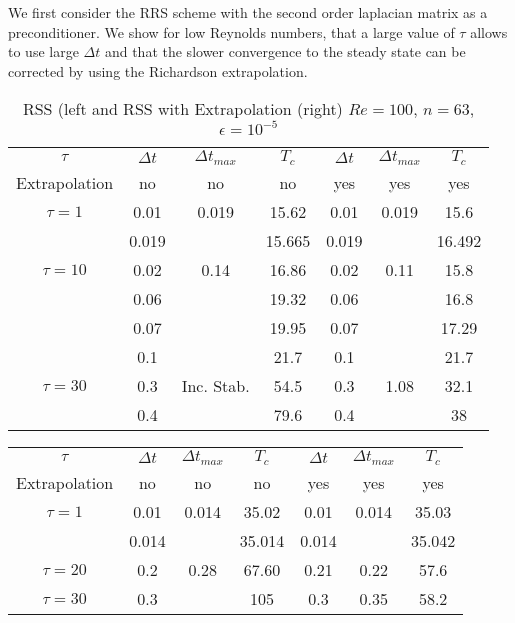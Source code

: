 \documentclass[11pt]{article}
\begin{document}
{We first consider the RRS scheme with the second order laplacian matrix  as a preconditioner. We show for low Reynolds numbers, that a large value of $\tau$ allows to use large $\Delta t$ and that the slower convergence to the steady state can be corrected by using the Richardson extrapolation.
\begin{table}[h!]
\begin{center}
\begin{tabular}{|c||c|c|c||c|c|c|}
\hline
$\tau$ & $\Delta t$ & $\Delta t_{max}$ & $T_c$ & $\Delta t$ & $\Delta t_{max}$ & $T_c$\\
Extrapolation & no  & no  & no  & yes& yes& yes\\
\hline 
\hline 
$\tau = 1$ & 0.01 & 0.019 & 15.62 & 0.01 & 0.019 & 15.6 \\ 
\hline
              & 0.019 &    & 15.665 & 0.019& & 16.492 \\
\hline 
\hline
$\tau = 10$&  0.02 & 0.14 & 16.86 & 0.02 & 0.11 & 15.8 \\ 
\hline 
  & 0.06 &   & 19.32 & 0.06 &   & 16.8 \\ 
\hline 
  & 0.07 &   & 19.95 & 0.07 &   & 17.29 \\ 
\hline 
  & 0.1 &   & 21.7  & 0.1 &   & 21.7 \\  
\hline 
\hline
$\tau = 30$    & 0.3 & Inc. Stab. & 54.5 & 0.3 &  1.08 & 32.1 \\ 
\hline 
  & 0.4 &   & 79.6 & 0.4 &   & 38 \\ 
\hline 
\hline
\end{tabular}
\caption{RSS (left and RSS with  Extrapolation (right) $Re=100$, $n=63$, $\epsilon=10^{-5}$}
\label{tab1}
\end{center}
\end{table}
\begin{table}[h!]
\begin{center}
\begin{tabular}{|c||c|c|c||c|c|c|}
\hline
$\tau$ & $\Delta t$ & $\Delta t_{max}$ & $T_c$ & $\Delta t$ & $\Delta t_{max}$ & $T_c$\\
Extrapolation & no  & no  & no  & yes& yes& yes\\
\hline 
\hline 
$\tau = 1$ & 0.01 & 0.014 & 35.02& 0.01 & 0.014 & 35.03 \\ 
\hline 
  & 0.014 &   & 35.014  & 0.014 &   & 35.042 \\ 
\hline 
\hline
$\tau = 20$   & 0.2 & 0.28& 67.60 & 0.21 & 0.22 & 57.6 \\ 
\hline 
\hline
$\tau = 30$    & 0.3 &   & 105 & 0.3 &0.35   & 58.2 \\ 

\end{tabular}
\end{center}
\end{table}}
\end{document}
